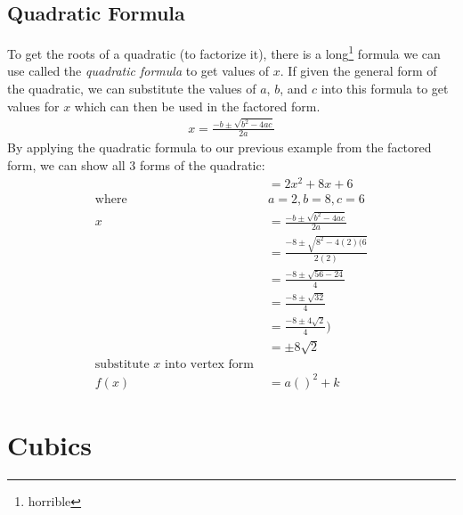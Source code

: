 \subsection{Quadratic Formula}
To get the roots of a quadratic (to factorize it), there is a
long\footnote{horrible} formula we can use called the \emph{quadratic formula}
to get values of $x$. If given the general form of the quadratic, we can
substitute the values of $a$, $b$, and $c$ into this formula to get values for
$x$ which can then be used in the factored form.
\begin{align}
  x = \frac{-b \pm \sqrt{b^2 - 4ac}}{2a}
\end{align}
By applying the quadratic formula to our previous example from the factored
form, we can show all 3 forms of the quadratic:
\begin{align}
  & = 2x^2 + 8x + 6 \nonumber \\
  \text{where} & a = 2, b = 8, c = 6 \nonumber \\
  x & = \frac{-b \pm \sqrt{b^2 - 4ac}}{2a} \\
    & = \frac{-8 \pm \sqrt{8^2 - 4(2)(6}}{2(2)} \\
    & = \frac{-8 \pm \sqrt{56 - 24}}{4} \\
    & = \frac{-8 \pm \sqrt{32}}{4} \\
    & = \frac{-8 \pm 4\sqrt{2}}{4}) \\    
    & = \pm 8\sqrt{2} \\
    \text{substitute $x$ into vertex form } \\
    f(x) & = a()^2 + k
\end{align}

\section{Cubics}
\lipsum[1]